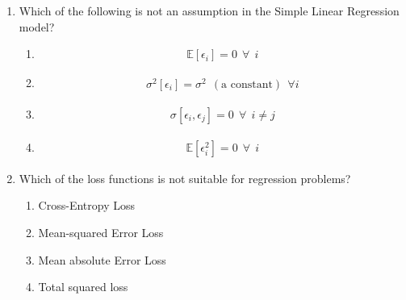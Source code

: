 \documentclass[11pt,letterpaper]{article}
\begin{document}
\begin{tcolorbox}[mcbox]
\begin{enumerate}[label=\textbf{Q\arabic*.}, leftmargin=*, itemsep=16pt]
How many trainable parameters are there in the above network (including biases)?

    \begin{multicols}{4}
      \begin{enumerate}[label=(\Alph*), noitemsep]
\item 325
\item 300
\item 55
\item 400
      \end{enumerate}
    \end{multicols}
    
    \item Which of the following is not an assumption in the Simple Linear Regression model?
    
      \begin{enumerate}[label=(\Alph*), noitemsep]
\item 

\begin{align*}
\mathbb{E}[\epsilon_i] = 0 ~~ \forall ~~ i
\end{align*} 


\item 

\begin{align*}
\sigma^2[\epsilon_i] = \sigma^2 ~~ (\text{a constant}) ~~\forall i
\end{align*} 


\item 

\begin{align*}
\sigma[\epsilon_i, \epsilon_j] = 0 ~~  \forall ~~ i \neq j
\end{align*} 

\item 

\begin{align*}
\mathbb{E}[\epsilon_i^2] = 0 ~~ \forall ~~ i
\end{align*} 


      \end{enumerate}

\item Which of the loss functions is not suitable for regression problems?

\begin{enumerate}
\item Cross-Entropy Loss
\item Mean-squared Error Loss
\item Mean absolute Error Loss
\item Total squared loss
\end{enumerate}


\end{enumerate}
\end{tcolorbox}
\end{document}
